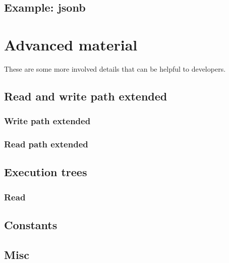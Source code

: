 \documentclass[11pt]{article}
\begin{document}
\hypertarget{example-jsonb}{%
\subsection{Example: jsonb}\label{example-jsonb}}


\newpage
\hypertarget{advanced-material}{%
\section{Advanced material}\label{advanced-material}}

These are some more involved details that can be helpful to developers.

\hypertarget{read-and-write-path-extended}{%
\subsection{Read and write path extended}\label{read-and-write-path-extended}}

\hypertarget{write-path-extended}{%
\subsubsection{Write path extended}\label{write-path-extended}}


\hypertarget{read-path-extended}{%
\subsubsection{Read path extended}\label{read-path-extended}}


\hypertarget{execution-trees}{%
\subsection{Execution trees}\label{execution-trees}}

\hypertarget{read}{%
\subsubsection{Read}\label{read}}


\hypertarget{constants}{%
\subsection{Constants}\label{constants}}


\hypertarget{misc}{%
\subsection{Misc}\label{misc}}

\end{document}
